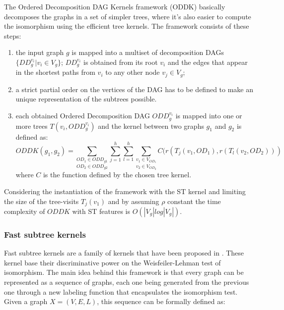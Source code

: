 The Ordered Decomposition DAG Kernels framework (ODDK) basically decomposes the
graphs in a set of simpler trees, where it's also easier to compute the isomorphism
using the efficient tree kernels.
The framework consists of these steps:

\begin{enumerate}
    \item the input graph $g$ is mapped into a multiset of decomposition DAGs\\
        $\{DD_g^{v_i}|v_i \in V_g\}$; $DD_g^{v_i}$ is obtained from its root $v_i$
        and the edges that appear in the shortest paths from $v_i$ to any other node
        $v_j \in V_g$;
    \item a strict partial order on the vertices of the DAG has to be defined
        to make an unique representation of the subtrees possible.
    \item each obtained Ordered Decomposition DAG $ODD_g^{v_i}$ is mapped into
        one or more trees $T(v_i,ODD_g^{v_i})$ and the kernel between two graphs
        $g_1$ and $g_2$ is defined as:
        \begin{equation}
            ODDK(g_1,g_2) = \underset{OD_2 \in ODD_{g2}}{\underset{OD_1 \in ODD_{g1}}{\sum}}
            \sum_{j=1}^h\sum_{l=1}^h
            \underset{v_2 \in V_{OD_2}}{\underset{v_1 \in V_{OD_1}}{\sum}}
            C(r(T_j(v_1,OD_1),r(T_l(v_2,OD_2)))
        \end{equation}
        where $C$ is the function defined by the chosen tree kernel.
\end{enumerate}

Considering the instantiation of the framework with the ST kernel and limiting
the size of the tree-visits $T_j(v_1)$ and by assuming $\rho$ constant the time
complexity of $ODDK$ with ST features is $O(|V_g|log|V_g|)$.


\subsubsection{Fast subtree kernels}
\label{subsubsec:fs}
Fast subtree kernels are a family of kernels that have been proposed in \cite{NIPS2009_3813}.
These kernel base their discriminative power on the Weisfeiler-Lehman test of
isomorphism.
The main idea behind this framework is that every graph can be represented as
a sequence of graphs, each one being generated from the previous one through
a new labeling function that encapsulates the isomorphism test.
Given a graph $X = (V,E,L)$, this sequence can be formally defined as:

